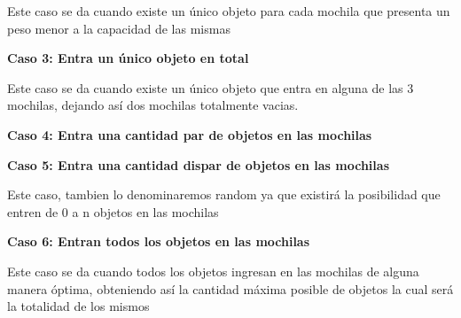 Este caso se da cuando existe un \'unico objeto para cada mochila que presenta un peso menor a la capacidad de las mismas

\begin{center}
\textbf{Caso 3: Entra un \'unico objeto en total}

\end{center}

Este caso se da cuando existe un \'unico objeto que entra en alguna de las 3 mochilas, dejando as\'i dos mochilas totalmente vacias.

\begin{center}
\textbf{Caso 4: Entra una cantidad par de objetos en las mochilas}

\end{center}

\begin{center}
\textbf{Caso 5: Entra una cantidad dispar de objetos en las mochilas}

\end{center}

Este caso, tambien lo denominaremos random ya que existir\'a la posibilidad que entren de 0 a n objetos en las mochilas

\begin{center}
\textbf{Caso 6: Entran todos los objetos en las mochilas}
\end{center}

Este caso se da cuando todos los objetos ingresan en las mochilas de alguna manera \'optima, obteniendo as\'i la cantidad m\'axima posible de objetos la cual ser\'a la totalidad de los mismos

